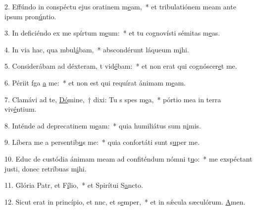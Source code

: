 2. Effúndo in conspéctu ejus oratinem m\uline{e}am,~* et tribulatiónem meam ante ipsum pron\uline{ú}ntio.\par 
3. In deficiéndo ex me spírtum m\uline{e}um:~* et tu cognovísti sémitas m\uline{e}as.\par 
4. In via hac, qua mbul\uline{á}bam,~* abscondérunt láqueum m\uline{i}hi.\par 
5. Considerábam ad déxteram, t vid\uline{é}bam:~* et non erat qui cognóscer\uline{e}t me.\par 
6. Périit fga \uline{a} me:~* et non est qui requírat ánimam m\uline{e}am.\par 
7. Clamávi ad te, \uline{Dó}mine,~† dixi: Tu s spes m\uline{e}a,~* pórtio mea in terra viv\uline{é}ntium.\par 
8. Inténde ad deprecatinem m\uline{e}am:~* quia humiliátus sum n\uline{i}mis.\par 
9. Líbera me a persentib\uline{u}s me:~* quia confortáti sunt s\uline{u}per me.\par 
10. Educ de custódia ánimam meam ad confiténdum nómni t\uline{u}o:~* me exspéctant justi, donec retríbuas m\uline{i}hi.\par 
11. Glória Patr, et F\uline{í}lio,~* et Spirítui S\uline{a}ncto.\par 
12. Sicut erat in princípio, et nnc, et s\uline{e}mper,~* et in sǽcula sæculórum. \uline{A}men.\par 
